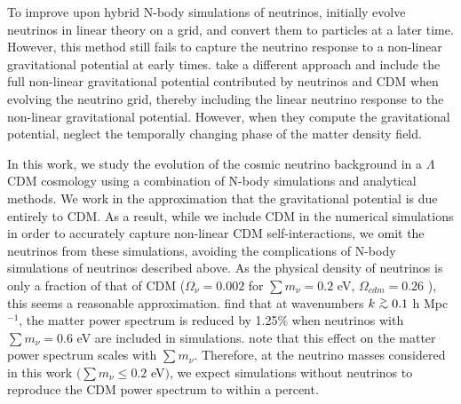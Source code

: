 \documentclass{aastex}
\def\gtsima{$\; \buildrel > \over \sim \;$}
\def\gsim{\lower.5ex\hbox{\gtsima}}
\begin{document}
To improve upon hybrid N-body simulations of neutrinos,
\cite{brandbyge09}
initially evolve neutrinos
in linear theory on a grid, and convert them to
particles at a later time.  However, this method still fails to
capture the neutrino response to a non-linear gravitational potential
at early times. \cite{yacine12} take a different approach and include
the full non-linear gravitational potential contributed by 
neutrinos and CDM when evolving the neutrino grid, 
thereby including the linear neutrino response to the
non-linear gravitational potential.  
However, when they compute the gravitational
potential, \cite{yacine12} neglect the temporally changing phase of the
matter density field.

In this work, we study the evolution of the cosmic neutrino
background in a $\Lambda$CDM
cosmology using a combination of N-body simulations and
analytical methods.  We work in the approximation that the
gravitational potential is due entirely to CDM.  As a
result, while we include CDM in the numerical
simulations in order to accurately capture non-linear 
CDM self-interactions, we omit
the neutrinos from these simulations, avoiding the complications of
N-body simulations of neutrinos described above.  
As the physical
density of neutrinos is only a fraction of that of CDM
($\Omega_\nu = 0.002$ for $\sum m_\nu = 0.2$ eV, $\Omega_{cdm} = 0.26$
\citep{planck15}), this seems a reasonable approximation. 
\cite{brandbyge08,brandbyge09} find that at wavenumbers $k\gsim 0.1$ h
Mpc$^{-1}$, the matter power spectrum is reduced by
1.25\% when neutrinos with $\sum m_\nu =0.6$ eV are included in simulations.
\cite{brandbyge09} 
note that
this effect on the matter power spectrum scales with
$\sum m_\nu$.  Therefore, at the neutrino masses considered in this
work $\big(\sum m_\nu \leq 0.2$ eV$\big)$, we expect simulations without
neutrinos to reproduce the CDM power spectrum to within
a percent.
\end{document}
